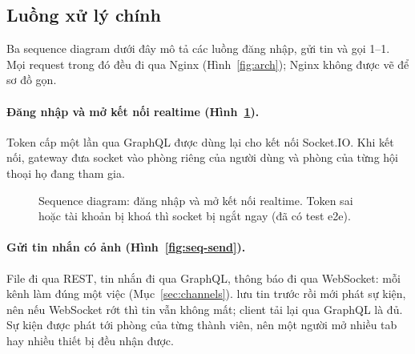 \documentclass[11pt, a4paper]{article}
\newcommand{\seqhead}[3]{%
  \node[draw=black!45, rounded corners=2pt, fill=black!4, font=\footnotesize\bfseries, align=center,
        minimum width=2.2cm, minimum height=0.75cm, inner sep=2pt] at (#1,0) {#2};
  \draw[black!35, dashed] (#1,-0.38) -- (#1,#3);}
\newcommand{\seqmsg}[4]{\draw[->, >=Stealth, thick, black!70] (#1,#3) -- node[seqlabel, above] {#4} (#2,#3);}
\newcommand{\seqret}[4]{\draw[->, >=Stealth, dashed, black!60] (#1,#3) -- node[seqlabel, above] {#4} (#2,#3);}
\newcommand{\seqself}[3]{%
  \draw[->, >=Stealth, thick, black!70] (#1,#2) -- ++(0.35,0) -- ++(0,-0.3) -- ++(-0.35,0);
  \node[seqlabel, anchor=west, align=left] at ($(#1,#2)+(0.42,-0.15)$) {#3};}
\newcommand{\seqselfl}[3]{%
  \draw[->, >=Stealth, thick, black!70] (#1,#2) -- ++(-0.35,0) -- ++(0,-0.3) -- ++(0.35,0);
  \node[seqlabel, anchor=east, align=right] at ($(#1,#2)+(-0.42,-0.15)$) {#3};}
\begin{document}
\subsection{Luồng xử lý chính}
\label{sec:flows}

Ba sequence diagram dưới đây mô tả các luồng đăng nhập, gửi tin và gọi 1--1. Mọi request trong đó đều đi qua Nginx (Hình~\ref{fig:arch}); Nginx không được vẽ để sơ đồ gọn.

\paragraph{Đăng nhập và mở kết nối realtime (Hình~\ref{fig:seq-login}).} Token cấp một lần qua GraphQL được dùng lại cho kết nối Socket.IO. Khi kết nối, gateway đưa socket vào phòng riêng của người dùng và phòng của từng hội thoại họ đang tham gia.

\begin{figure}[!htb]
  \centering
  \caption{Sequence diagram: đăng nhập và mở kết nối realtime. Token sai hoặc tài khoản bị khoá thì socket bị ngắt ngay (đã có test e2e).}
  \label{fig:seq-login}
\end{figure}

\paragraph{Gửi tin nhắn có ảnh (Hình~\ref{fig:seq-send}).} File đi qua REST, tin nhắn đi qua GraphQL, thông báo đi qua WebSocket: mỗi kênh làm đúng một việc (Mục~\ref{sec:channels}).  lưu tin trước rồi mới phát sự kiện, nên nếu WebSocket rớt thì tin vẫn không mất; client tải lại qua GraphQL là đủ. Sự kiện được phát tới phòng  của từng thành viên, nên một người mở nhiều tab hay nhiều thiết bị đều nhận được.
\end{document}
